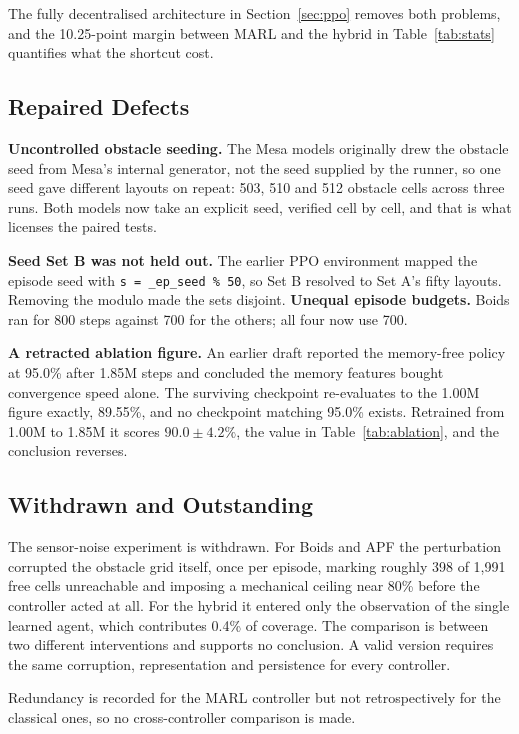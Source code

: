 \documentclass[a4paper, 10pt, conference]{ieeeconf}
\begin{document}
The fully decentralised architecture in Section~\ref{sec:ppo} removes
both problems, and the 10.25-point margin between MARL and the hybrid
in Table~\ref{tab:stats} quantifies what the shortcut cost.

\subsection{Repaired Defects}

\textbf{Uncontrolled obstacle seeding.} The Mesa models originally
drew the obstacle seed from Mesa's internal generator, not the seed
supplied by the runner, so one seed gave different layouts on repeat:
503, 510 and 512 obstacle cells across three runs. Both models now
take an explicit seed, verified cell by cell, and that is what
licenses the paired tests.

\textbf{Seed Set B was not held out.} The earlier PPO environment
mapped the episode seed with \texttt{s = \_ep\_seed \% 50}, so Set B
resolved to Set A's fifty layouts. Removing the modulo made the sets
disjoint. \textbf{Unequal episode budgets.} Boids ran for 800 steps
against 700 for the others; all four now use 700.

\textbf{A retracted ablation figure.} An earlier draft reported the
memory-free policy at 95.0\% after 1.85M steps and concluded the
memory features bought convergence speed alone. The surviving
checkpoint re-evaluates to the 1.00M figure exactly, 89.55\%, and no
checkpoint matching 95.0\% exists. Retrained from 1.00M to 1.85M it
scores $90.0\pm4.2\%$, the value in Table~\ref{tab:ablation}, and the
conclusion reverses.

\subsection{Withdrawn and Outstanding}

The sensor-noise experiment is withdrawn. For Boids and APF the
perturbation corrupted the obstacle grid itself, once per episode,
marking roughly 398 of 1{,}991 free cells unreachable and imposing a
mechanical ceiling near 80\% before the controller acted at all. For
the hybrid it entered only the observation of the single learned
agent, which contributes 0.4\% of coverage. The comparison is between
two different interventions and supports no conclusion. A valid
version requires the same corruption, representation and persistence
for every controller.

Redundancy is recorded for the MARL controller but not retrospectively
for the classical ones, so no cross-controller comparison is made.
\end{document}

